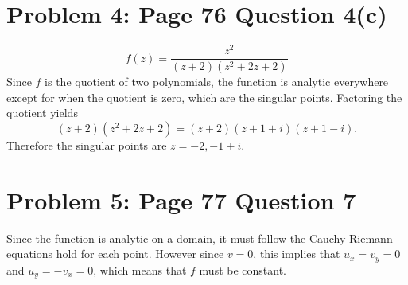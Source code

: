 \documentclass{article}
\begin{document}
\section*{Problem 4: Page 76 Question 4(c)}
\[
	f(z) = \frac{z^2}{(z+2)(z^2+2z+2)}
\]
Since $f$ is the quotient of two polynomials,
the function is analytic everywhere except
for when the quotient is zero, which are the singular points.
Factoring the quotient yields
\[
	(z+2)(z^2 + 2z+2) = (z+2)(z+1+i)(z+1-i).
\]
Therefore the singular points are 
$z = -2, -1 \pm i$.
\newpage
\section*{Problem 5: Page 77 Question 7}
Since the function is analytic on a domain, it must follow
the Cauchy-Riemann equations hold for each point.
However since $v = 0$, this implies that 
$u_x = v_y = 0$ and $u_y = -v_x = 0$, which means that $f$ must be constant.

\newpage
\end{document}
